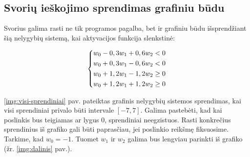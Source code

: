 \documentclass{VUMIFPSbakalaurinis}
\begin{document}
\subsection{Svorių ieškojimo sprendimas grafiniu būdu}

Svorius galima rasti ne tik programos pagalba, bet ir grafiniu
būdu išsprendžiant šią nelygybių sistemą, 
kai aktyvacijos funkcija slenkstinė:

\begin{equation*}
  \begin{dcases}
    w_0 - 0,3w_1 + 0,6w_2 < 0 \\
    w_0 + 0,3w_1 - 0,6w_2 < 0 \\
    w_0 + 1,2w_1 - 1,2w_2 \geq  0 \\
    w_0 + 1,2w_1 + 1,2w_2 \geq  0
  \end{dcases}
\end{equation*}

\ref{img:visi-sprendiniai} pav. pateiktas grafinis
nelygybių sistemos sprendimas, kai visi sprendiniai
privalo būti intervale $[-7, 7]$.
Galima pastebėti, kad kai poslinkis bus teigiamas ar lygus 0,
sprendiniai neegzistuos.
Rasti konkrečius sprendinius iš grafiko gali būti paprasčiau,
jei poslinkio reikšmę fiksuosime.
Tarkime, kad $w_0 = -1$. Tuomet $w_1$ ir $w_2$ galima bus lengviau
parinkti iš grafiko (žr. \ref{img:dalinis} pav.).


\end{document}
